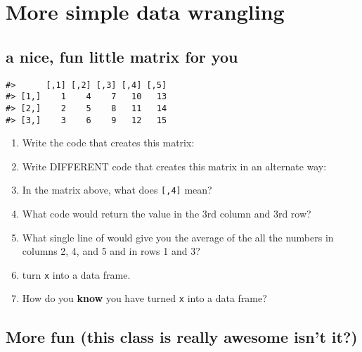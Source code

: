 \documentclass[
]{book}
\begin{document}
\hypertarget{more-simple-data-wrangling}{%
\chapter{More simple data wrangling}\label{more-simple-data-wrangling}}

\hypertarget{a-nice-fun-little-matrix-for-you}{%
\section{\texorpdfstring{a nice, fun little matrix for \textbf{you}}{a nice, fun little matrix for you}}\label{a-nice-fun-little-matrix-for-you}}

\begin{verbatim}
#>      [,1] [,2] [,3] [,4] [,5]
#> [1,]    1    4    7   10   13
#> [2,]    2    5    8   11   14
#> [3,]    3    6    9   12   15
\end{verbatim}

\begin{enumerate}
\def\labelenumi{\arabic{enumi}.}
\item
  Write the code that creates this matrix:
\item
  Write DIFFERENT code that creates this matrix in an alternate way:
\item
  In the matrix above, what does \texttt{{[},4{]}} mean?
\item
  What code would return the value in the 3rd column and 3rd row?
\item
  What single line of would give you the average of the all the numbers in columns 2, 4, and 5 and in rows 1 and 3?
\item
  turn \texttt{x} into a data frame.
\item
  How do you \textbf{know} you have turned \texttt{x} into a data frame?
\end{enumerate}

\hypertarget{more-fun-this-class-is-really-awesome-isnt-it}{%
\section{\texorpdfstring{More fun (this class is really \textbf{awesome} isn't it?)}{More fun (this class is really awesome isn't it?)}}\label{more-fun-this-class-is-really-awesome-isnt-it}}
\end{document}
